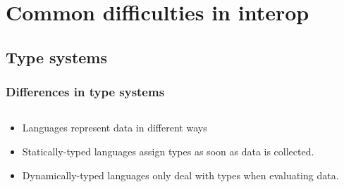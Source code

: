 \documentclass{beamer}
\begin{document}
\section[Difficulties]{Common difficulties in interop}


\subsection{Type systems}
\begin{frame}
  \frametitle{Differences in type systems}
  
  \begin{columns}
  \begin{column}{0.6\textwidth}
  \begin{itemize}
  	\item Languages represent data in different ways %
	\item Statically-typed languages assign types as soon as data is collected.
	\item Dynamically-typed languages only deal with types when evaluating data.
  \end{itemize}
  \end{column}


\end{columns}
\end{frame}
\end{document}
